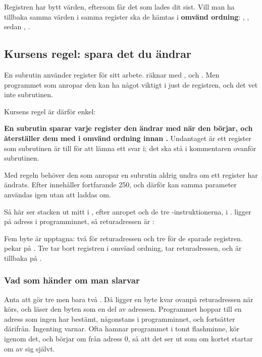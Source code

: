 
Registren har bytt värden, eftersom  får det som lades dit sist. Vill man ha tillbaka
samma värden i samma register ska de hämtas i \textbf{omvänd ordning}: ,
, sedan , .

\subsection{Kursens regel: spara det du ändrar}
\label{c10:c6}
En subrutin använder register för sitt arbete.  räknar med , 
och . Men programmet som anropar den kan ha något viktigt i just de registren, och det
vet inte subrutinen.

Kursens regel är därför enkel:

\begin{aside}
\textbf{En subrutin sparar varje register den ändrar med  när den börjar, och återställer
dem med  i omvänd ordning innan .} Undantaget är ett register som subrutinen är
till för att lämna ett svar i; det ska stå i kommentaren ovanför subrutinen.
\end{aside}

Med regeln behöver den som anropar en subrutin aldrig undra om ett register har ändrats. Efter
 innehåller  fortfarande 250, och därför kan samma parameter
användas igen utan att laddas om.

Så här ser stacken ut mitt i , efter anropet och de tre -instruktionerna,
i .  ligger på adress  i programminnet, så
returadressen är :


Fem byte är upptagna: två för returadressen och tre för de sparade registren.  pekar på
. Tre  tar bort registren i omvänd ordning,  tar returadressen,
och  är tillbaka på .

\subsubsection{Vad som händer om man slarvar}
Anta att  gör tre  men bara två . Då ligger en byte kvar ovanpå
returadressen när  körs, och  läser den byten som en del av adressen.
Programmet hoppar till en adress som ingen har bestämt, någonstans i programminnet, och fortsätter
därifrån. Ingenting varnar. Ofta hamnar programmet i tomt flashminne, kör igenom det, och börjar om
från adress 0, så att det ser ut som om kortet startar om av sig självt.

